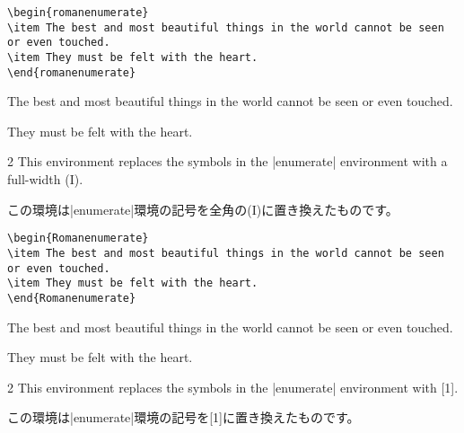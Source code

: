 \documentclass[%
fleqn,%
paper=a4paper,%
fontsize=10pt,%
open_bracket_pos=zenkakunibu_nibu,%
hanging_punctuation,%
]%
{jlreq}
\newenvironment{translateing}%
{\begin{multicolpar}{2}}
{\end{multicolpar}\vspace{\baselineskip}}
\begin{document}
\begin{lstlisting}
\begin{romanenumerate}
\item The best and most beautiful things in the world cannot be seen or even touched.
\item They must be felt with the heart.
\end{romanenumerate}
\end{lstlisting}

\begin{macroexample}
\begin{romanenumerate}
\item The best and most beautiful things in the world cannot be seen or even touched.
\item They must be felt with the heart.
\end{romanenumerate}
\end{macroexample}

\newpage
{}

\begin{translateing}
This environment replaces the symbols in the |enumerate| environment with a full-width (I).

この環境は|enumerate|環境の記号を全角の(I)に置き換えたものです。
\end{translateing}

\begin{lstlisting}
\begin{Romanenumerate}
\item The best and most beautiful things in the world cannot be seen or even touched.
\item They must be felt with the heart.
\end{Romanenumerate}
\end{lstlisting}

\begin{macroexample}
\begin{Romanenumerate}
\item The best and most beautiful things in the world cannot be seen or even touched.
\item They must be felt with the heart.
\end{Romanenumerate}
\end{macroexample}


\begin{translateing}
This environment replaces the symbols in the |enumerate| environment with [1].

この環境は|enumerate|環境の記号を[1]に置き換えたものです。
\end{translateing}
\end{document}
